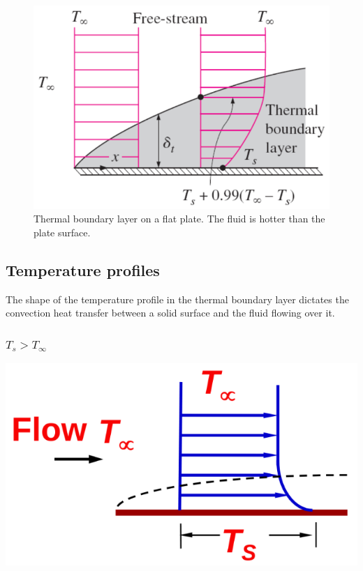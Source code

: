 \documentclass[11pt]{article}
\begin{document}
\begin{figure}[htbp]
\centering
\includegraphics[width=.9\linewidth]{./images/thermal-boundary-layer-diagram.png}
\caption{Thermal boundary layer on a flat plate. The fluid is hotter than the plate surface.}
\end{figure}

 \newpage

\subsection{Temperature profiles}
\label{sec:org95a38fb}
The shape of the temperature profile in the thermal boundary layer dictates the convection heat transfer between a solid surface and the fluid flowing over it.

\subsubsection{\(T_s > T_{\infty}\)}
\label{sec:orgc67fb2d}
\begin{center}
\includegraphics[width=.9\linewidth]{./images/temperature-profile-ts-greater-than-t-infinity.png}
\end{center}
\end{document}
